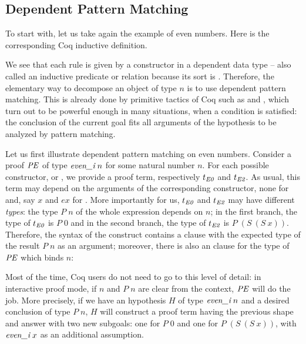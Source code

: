 \subsection{Dependent Pattern Matching}
\label{sec:dpm}

To start with, 
let us take again the example of even numbers.
Here is the corresponding Coq inductive definition.

\medskip
{}
\medskip

\noindent
We see that each rule is given by a constructor in a dependent data type
-- also called an inductive predicate or relation because its sort is \Prop.
Therefore, the elementary way to decompose an object of type \eveni $n$
is to use dependent pattern matching.
This is already done by primitive tactics of Coq
such as  and ,
which turn out to be powerful enough in many situations, 
when a condition is satisfied:
the conclusion of the current goal fits all arguments of 
the hypothesis to be analyzed by pattern matching.

Let us first illustrate 
dependent pattern matching on even numbers.
Consider a proof $\mathit{PE}$ of type $\textit{even\_i}\;n$
for some natural number $n$.
For each possible constructor, \EZ or \ET, 
we provide a proof term,
respectively $t_{\textit{E0}}$ and $t_{\textit{E2}}$.
As usual, this term may depend on the arguments 
of the corresponding constructor,
none for \EZ and, say $x$ and $ex$ for \ET.
More importantly for us, $t_{\textit{E0}}$ and $t_{\textit{E2}}$ may have
different \emph{types}:
the type $P\;n$ of the whole expression depends on $n$;
in the first branch, the type of $t_{\textit{E0}}$ is $P\;0$ and
in the second branch, the type of $t_{\textit{E2}}$ is $P\; (S\: (S\:x))$.
Therefore, the syntax of the  construct
contains a  clause with the expected type
of the result $P\;n$ as an argument;
moreover, 
there is also an  clause for the type of $\mathit{PE}$
which binds $n$:

{}

\vspace*{-.7\baselineskip}
\noindent
Most of the time, Coq users do not need to go to this
level of detail: 
in interactive proof mode, 
if $n$ and $P\;n$ are clear from the context,
\casetac $\mathit{PE}$ will do the job.
More precisely, if we have an hypothesis $H$ of type $\textit{even\_i}\;n$
and a desired conclusion of type $P\;n$, 
\casetac $H$ will construct a proof term having the previous
shape and answer with two new subgoals:
one for $P\;0$ and one for $P\; (S\: (S\:x))$,
with $\textit{even\_i}\;x$ as an additional assumption.

